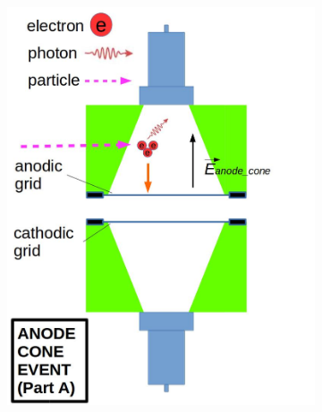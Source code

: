 \begin{figure}[!htbp]
	\centering
	\begin{subfigure}[b]{0.8\textwidth}
		\centering
		\includegraphics[width=\halfwidth,clip,trim={0 0 0 0},angle=0,origin=c]{Figures/GasTest/WeiDrawEvent/AboveAnoA.jpg}

\end{subfigure}
\end{figure}

